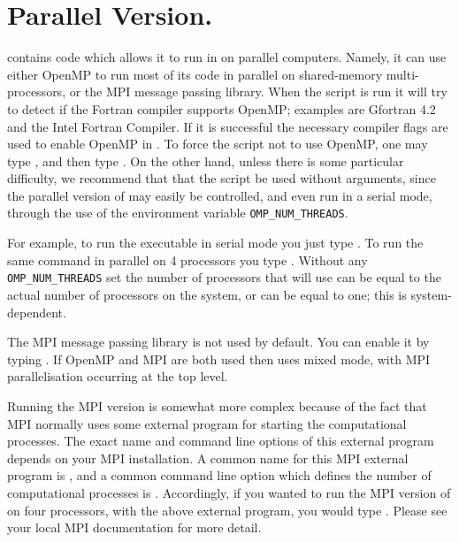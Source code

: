 \documentclass[12pt]{report}
\begin{document}
\section{Parallel Version.} \label{sec:Parallel}
\AUTO contains code which allows
it to run in on parallel computers.  Namely,
it can use either OpenMP to run most of its code in parallel
on shared-memory multi-processors, or the MPI message passing
library.
When the  script is run it will try to
detect if the Fortran compiler supports OpenMP; examples
are Gfortran 4.2 and the Intel Fortran Compiler.
If it is successful the necessary compiler flags are used
to enable OpenMP in \AUTO.
To force the  script not to use OpenMP,
one may type ,
and then type .
On the other hand, unless there is some
particular difficulty, we recommend that that the 
 script be used without arguments, since the
parallel version of \AUTO may easily be controlled,
and even run in a serial mode,  
through the use of the environment variable {\tt OMP\_NUM\_THREADS}.

For example, to run the \AUTO executable 
in serial mode you just type .
To run the same command in parallel on 4 processors you type 
. Without any {\tt OMP\_NUM\_THREADS}
set the number of processors that \AUTO will use can be equal to the
actual number of processors on the system, or can be equal to one;
this is system-dependent.

The MPI message passing library is not used by default. You can enable it
by typing  . If OpenMP and MPI are
both used then \AUTO uses mixed mode, with MPI parallelisation
occurring at the top level.

Running the MPI version is somewhat more complex because of the fact
that MPI normally uses some external program for starting the
computational processes.  The exact name and command line options of
this external program depends on your MPI installation.  A common name
for this MPI external program is , and a common command
line option which defines the number of computational processes is .  Accordingly, if you wanted to run the MPI version of \AUTO
on four processors, with the above external program, you would
type .  Please see your local MPI
documentation for more detail.

\end{document}
